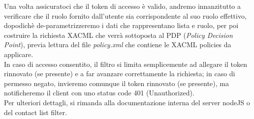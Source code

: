 Una volta assicuratoci che il token di accesso è valido, andremo innanzitutto a verificare che il ruolo fornito dall'utente sia corrispondente al suo ruolo effettivo, dopodichè de-parametrizzeremo i dati che rappresentano lista e ruolo, per poi costruire la richiesta XACML che verrà sottoposta al PDP (\textit{Policy Decision Point}), previa lettura del file \textit{policy.xml} che contiene le XACML policies da applicare.\\
In caso di accesso consentito, il filtro si limita semplicemente ad allegare il token rinnovato (se presente) e a far avanzare correttamente la richiesta; in caso di permesso negato, invieremo comunque il token rinnovato (se presente), ma notificheremo il client con uno status code 401 (Unauthorized).\\

Per ulteriori dettagli, si rimanda alla documentazione interna del server nodeJS o del contact list filter.\\

